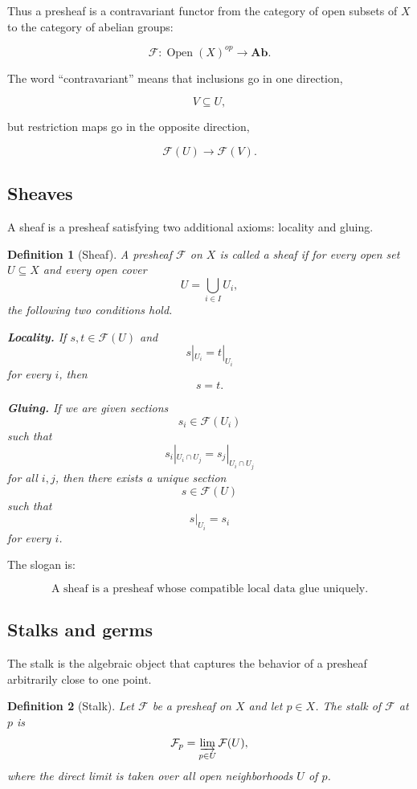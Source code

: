 \documentclass[12pt,a4paper]{article}
\theoremstyle{notespace}
\newtheorem{definition}{Definition}[subsection]
\begin{document}
Thus a presheaf is a contravariant functor from the category of open subsets
of $X$ to the category of abelian groups:

\[
\mathcal F : \operatorname{Open}(X)^{op}
\longrightarrow
\mathbf{Ab}.
\]

The word ``contravariant'' means that inclusions go in one direction,

\[
V \subseteq U,
\]

but restriction maps go in the opposite direction,

\[
\mathcal F(U) \longrightarrow \mathcal F(V).
\]

\subsection{Sheaves}
A sheaf is a presheaf satisfying two additional axioms: locality and gluing.

\begin{definition}[Sheaf]
	A presheaf $\mathcal F$ on $X$ is called a sheaf if for every open set
	$U \subseteq X$ and every open cover
	\[
	U = \bigcup_{i \in I} U_i,
	\]
	the following two conditions hold.
	
	\textbf{Locality.}
	If $s,t \in \mathcal F(U)$ and
	\[
	s|_{U_i} = t|_{U_i}
	\]
	for every $i$, then
	\[
	s=t.
	\]
	
	\textbf{Gluing.}
	If we are given sections
	\[
	s_i \in \mathcal F(U_i)
	\]
	such that
	\[
	s_i|_{U_i \cap U_j}
	=
	s_j|_{U_i \cap U_j}
	\]
	for all $i,j$, then there exists a unique section
	\[
	s \in \mathcal F(U)
	\]
	such that
	\[
	s|_{U_i}=s_i
	\]
	for every $i$.
\end{definition}

The slogan is:

\[
\boxed{
	\text{A sheaf is a presheaf whose compatible local data glue uniquely.}
}
\]

\subsection{Stalks and germs}
The stalk is the algebraic object that captures the behavior of a presheaf
arbitrarily close to one point.

\begin{definition}[Stalk]
	Let $\mathcal F$ be a presheaf on $X$ and let $p \in X$.
	The stalk of $\mathcal F$ at $p$ is
	\[
	\mathcal F_p
	=
	\varinjlim_{p \in U} \mathcal F(U),
	\]
	where the direct limit is taken over all open neighborhoods $U$ of $p$.
\end{definition}
\end{document}
